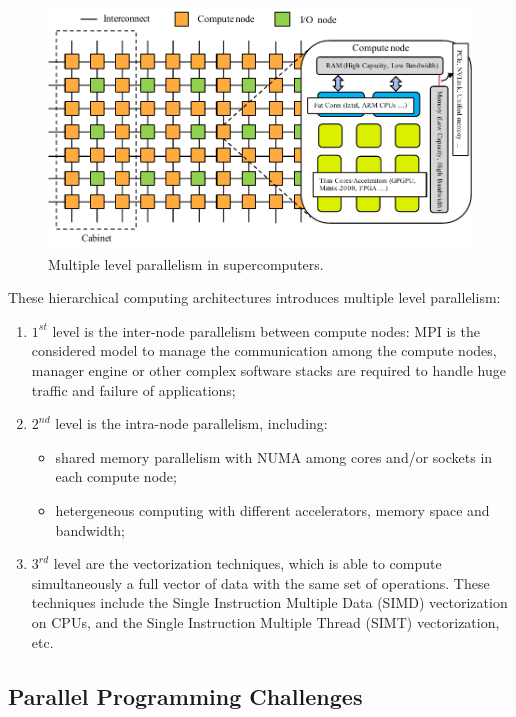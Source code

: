 \begin{figure}[htbp]
	\centering
	\includegraphics[width=6.2in]{fig/supercomputer_arch.pdf}
	\caption{Multiple level parallelism in supercomputers.}
	\label{fig:supercomputer_arch}
\end{figure}

These hierarchical computing architectures introduces multiple level parallelism:

\begin{enumerate}
	\item $1^{st}$ level is the inter-node parallelism between compute nodes: MPI is the considered model to manage the communication among the compute nodes, manager engine or other complex software stacks are required to handle huge traffic and failure of applications;
	\item $2^{nd}$ level is the intra-node parallelism, including:
	\begin{itemize}
		\item shared memory parallelism with NUMA among cores and/or sockets in each compute node;
		\item hetergeneous computing with different accelerators, memory space and bandwidth;
	\end{itemize}
	\item $3^{rd}$ level are the vectorization techniques, which is able to compute simultaneously a full vector of data with the same set of operations. These techniques include the Single Instruction Multiple Data (SIMD) vectorization on CPUs, and the Single Instruction Multiple Thread (SIMT) vectorization, etc.
\end{enumerate}

\subsection{Parallel Programming Challenges} \label{Parallel Programming Challenges}

